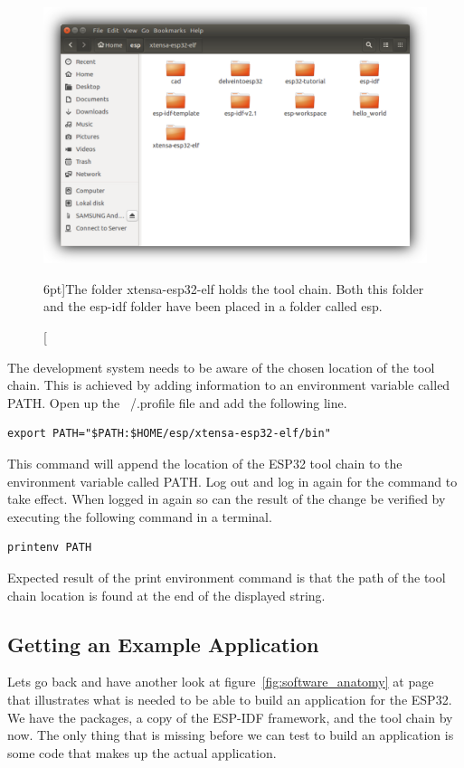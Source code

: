 \documentclass{tufte-book}
\begin{document}
\begin{figure}
	\includegraphics{tool_chain_folder_shadowed.png}
	\caption[ $n$.][6pt]{The folder xtensa-esp32-elf holds the tool chain. Both this folder and the esp-idf folder have been placed in a folder called esp.}
	\label{fig:tool_chain_folder_shadowed}
\end{figure}


The development system needs to be aware of the chosen location of the tool chain. This is achieved by adding information to an environment variable called PATH. Open up the ~/.profile file and add the following line.

\begin{lstlisting}
export PATH="$PATH:$HOME/esp/xtensa-esp32-elf/bin"
\end{lstlisting}

This command will append the location of the ESP32 tool chain to the environment variable called PATH. Log out and log in again for the command to take effect. When logged in again so can the result of the change be verified by executing the following command in a terminal.

\begin{lstlisting}
printenv PATH
\end{lstlisting}

Expected result of the print environment command is that the path of the tool chain location is found at the end of the displayed string.

\subsection{Getting an Example Application}
Lets go back and have another look at figure~\ref{fig:software_anatomy} at page~\pageref{fig:software_anatomy} that illustrates what is needed to be able to build an application for the ESP32. We have the packages, a copy of the ESP-IDF framework, and the tool chain by now. The only thing that is missing before we can test to build an application is some code that makes up the actual application.
\end{document}
